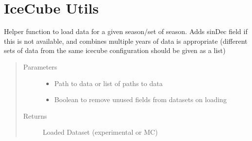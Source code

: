\documentclass[letterpaper,10pt,english]{sphinxmanual}
\begin{document}
\section{IceCube Utils}
\label{\detokenize{index:module-flarestack.icecube_utils.dataset_loader}}\label{\detokenize{index:icecube-utils}}

\begin{fulllineitems}
\label{\detokenize{index:flarestack.icecube_utils.dataset_loader.convert_grl}}
\end{fulllineitems}


\begin{fulllineitems}
\label{\detokenize{index:flarestack.icecube_utils.dataset_loader.data_loader}}
Helper function to load data for a given season/set of season.
Adds sinDec field if this is not available, and combines multiple years
of data is appropriate (different sets of data from the same icecube
configuration should be given as a list)
\begin{quote}\begin{description}
\item[{Parameters}] \leavevmode\begin{itemize}
\item {} 
 \textendash{} Path to data or list of paths to data

\item {} 
 \textendash{} Boolean to remove unused fields from datasets on loading

\end{itemize}

\item[{Returns}] \leavevmode
Loaded Dataset (experimental or MC)

\end{description}\end{quote}

\end{fulllineitems}
\end{document}
